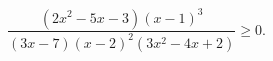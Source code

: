 \begin{ex}[type=inequality]
	\begin{condition}
		$ \dfrac{(2x^2 - 5x - 3)(x - 1)^3}{(3x- 7)(x - 2)^2 (3x^2 - 4x + 2)}\geqslant0.$
	\end{condition}
\end{ex}